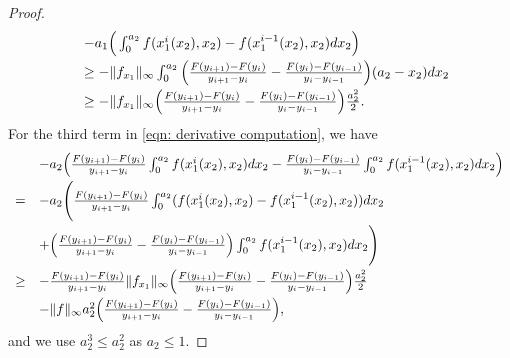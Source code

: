 \documentclass[12pt,reqno]{amsart}
\begin{document}
\begin{proof}
\[
        \begin{array}{ll}
        &-a_1\Big(\int_0^{a_2}f(x_1^{i}(x_2),x_2)-f(x_1^{i-1}(x_2),x_2)dx_2\Big)\vspace{3pt}\\
        &\ge - \|f_{x_1}\|_\infty\int_0^{a_2}\Big(\frac{F(y_{i+1})-F(y_i)}{y_{i+1}-y_i}-\frac{F(y_{i})-F(y_{i-1})}{y_{i}-y_{i-1}}\Big)(a_2-x_2)dx_2\vspace{3pt}\\
        &\ge-\|f_{x_1}\|_\infty\Big(\frac{F(y_{i+1})-F(y_i)}{y_{i+1}-y_i}-\frac{F(y_{i})-F(y_{i-1})}{y_{i}-y_{i-1}}\Big)\frac{a_2^2}{2}.
        \end{array}\]
For the third term in \eqref{eqn: derivative computation}, we have 
\[\begin{array}{ll}
          &-a_2\Big(\frac{F(y_{i+1})-F(y_i)}{y_{i+1}-y_i}\int_0^{a_2}f(x_1^{i}(x_2),x_2)dx_2-\frac{F(y_i)-F(y_{i-1})}{y_i-y_{i-1}}\int_0^{a_2}f(x_1^{i-1}(x_2),x_2)dx_2\Big)\vspace{3pt}\\
        =&-a_2\Bigg(\frac{F(y_{i+1})-F(y_i)}{y_{i+1}-y_i}\int_0^{a_2}(f(x_1^{i}(x_2),x_2)-f(x_1^{i-1}(x_2),x_2))dx_2\vspace{3pt}\\
        &+\Big(\frac{F(y_{i+1})-F(y_i)}{y_{i+1}-y_i}-\frac{F(y_i)-F(y_{i-1})}{y_i-y_{i-1}}\Big)\int_0^{a_2}f(x_1^{i-1}(x_2),x_2)dx_2\Bigg)\vspace{3pt}\\
        \ge&- \frac{F(y_{i+1})-F(y_i)}{y_{i+1}-y_i}\|f_{x_1}\|_\infty\Big(\frac{F(y_{i+1})-F(y_i)}{y_{i+1}-y_i}-\frac{F(y_{i})-F(y_{i-1})}{y_{i}-y_{i-1}}\Big)\frac{a_2^2}{2}\vspace{3pt}\\
        &-\|f\|_\infty a_2^2\Big(\frac{F(y_{i+1})-F(y_i)}{y_{i+1}-y_i}
        -\frac{F(y_i)-F(y_{i-1})}{y_i-y_{i-1}}\Big),
        \end{array}\]
and we use $a_2^3\le a_2^2$ as $a_2\le1.$


\end{proof}
\end{document}
